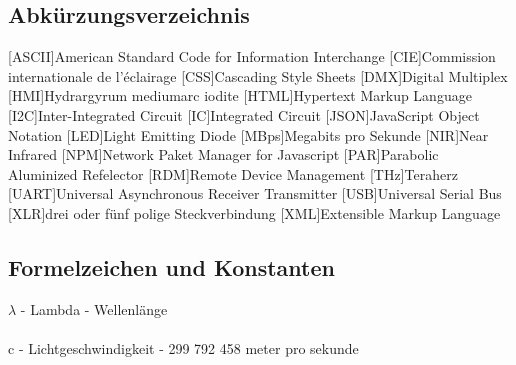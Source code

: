 \documentclass[11pt]{scrartcl}
\begin{document}
\subsection{Abkürzungsverzeichnis}
\begin{acronym}
    [ASCII]{American Standard Code for Information Interchange}
    [CIE]{Commission internationale de l’éclairage}
    [CSS]{Cascading Style Sheets}
    [DMX]{Digital Multiplex}
    [HMI]{Hydrargyrum mediumarc iodite}
    [HTML]{Hypertext Markup Language}
    [I2C]{Inter-Integrated Circuit}
    [IC]{Integrated Circuit}
    [JSON]{JavaScript Object Notation}
    [LED]{Light Emitting Diode}
    [MBps]{Megabits pro Sekunde}
    [NIR]{Near Infrared}
    [NPM]{Network Paket Manager for Javascript}
    [PAR]{Parabolic Aluminized Refelector}
    [RDM]{Remote Device Management}
    [THz]{Teraherz}
    [UART]{Universal Asynchronous Receiver Transmitter}
    [USB]{Universal Serial Bus}
    [XLR]{drei oder fünf polige Steckverbindung}
    [XML]{Extensible Markup Language}
\end{acronym}
\clearpage

\subsection{Formelzeichen und Konstanten}
$\lambda$ - Lambda - Wellenlänge\\
\\
c - Lichtgeschwindigkeit - 299 792 458 meter pro sekunde
\clearpage
\end{document}
